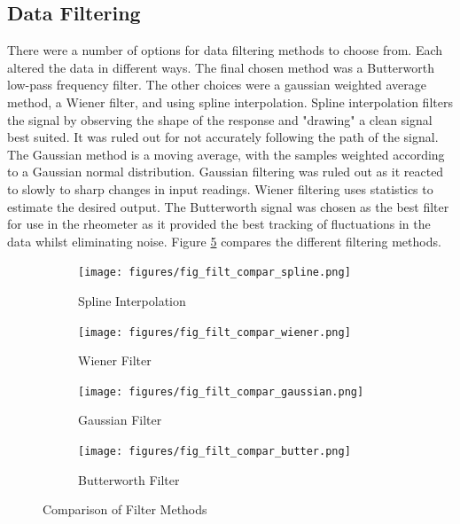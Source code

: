 \documentclass[twoside,a4]{report}
\begin{document}
	\subsection*{Data Filtering}
	There were a number of options for data filtering methods to choose from. Each altered the data in different ways. The final chosen method was a Butterworth low-pass frequency filter. The other choices were a gaussian weighted average method, a Wiener filter, and using spline interpolation. Spline interpolation filters the signal by observing the shape of the response and "drawing" a clean signal best suited. It was ruled out for not accurately following the path of the signal. The Gaussian method is a moving average, with the samples weighted according to a Gaussian normal distribution. Gaussian filtering was ruled out as it reacted to slowly to sharp changes in input readings. Wiener filtering uses statistics to estimate the desired output. The Butterworth signal was chosen as the best filter for use in the rheometer as it provided the best tracking of fluctuations in the data whilst eliminating noise. Figure \ref{figfiltcomp} compares the different filtering methods.
	
	\begin{figure}[!htb]
		\centering
		\begin{subfigure}[t]{0.45\textwidth}
			\centering
			\texttt{[image: figures/fig\_filt\_compar\_spline.png]}
			\caption{Spline Interpolation}
			\label{figfiltsp}
			\footnotesize
		\end{subfigure}
		\begin{subfigure}[t]{0.45\textwidth}
			\centering
			\texttt{[image: figures/fig\_filt\_compar\_wiener.png]}
			\caption{Wiener Filter}
			\label{figfiltwi}
			\footnotesize
		\end{subfigure}
		\begin{subfigure}[t]{0.45\textwidth}
			\centering
			\texttt{[image: figures/fig\_filt\_compar\_gaussian.png]}
			\caption{Gaussian Filter}
			\label{figfiltga}
			\footnotesize
		\end{subfigure}
		\begin{subfigure}[t]{0.45\textwidth}
			\centering
			\texttt{[image: figures/fig\_filt\_compar\_butter.png]}
			\caption{Butterworth Filter}
			\label{figfiltbu}
			\footnotesize
		\end{subfigure}
		\caption{Comparison of Filter Methods \label{figfiltcomp}}
	\end{figure}
	
\end{document}
